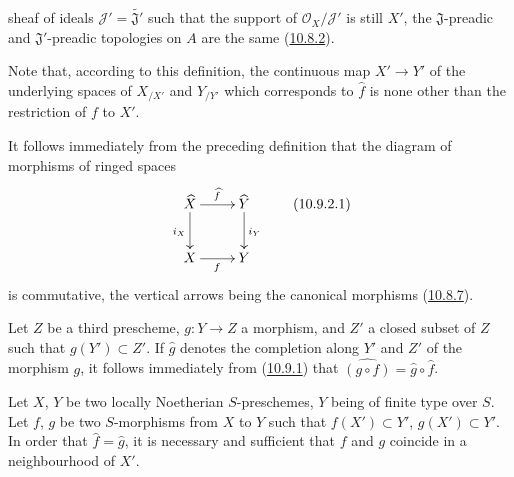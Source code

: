 \begin{env}[10.9.1]

sheaf of ideals
$\mathscr{J}'=\widetilde{\mathfrak{J}'}$ such that the support of
$\mathscr{O}_X/\mathscr{J}'$ is still $X'$, the
$\mathfrak{J}$-preadic and $\mathfrak{J}'$-preadic topologies on $A$
are the same (\hyperref[I.10.8.2]{10.8.2}).

Note that, according to this definition, the continuous map
$X'\to Y'$ of the underlying spaces of $X_{/X'}$ and $Y_{/Y'}$ which
corresponds to $\widehat f$ is none other than the restriction of $f$ to
$X'$.
\end{env}

\begin{env}[10.9.2]
\label{I.10.9.2}
It follows immediately from the preceding definition that the diagram
of morphisms of ringed spaces
\[ \xymatrix{
    \widehat X\ar[r]^{\widehat f}\ar[d]_{i_X} &
    \widehat Y\ar[d]^{i_Y}\\
    X\ar[r]_f &
    Y
  }
\tag{10.9.2.1}\label{I.10.9.2.1}
\]
is commutative, the vertical arrows being the canonical morphisms
(\hyperref[I.10.8.7]{10.8.7}).
\end{env}

\begin{env}[10.9.3]
\label{I.10.9.3}
Let $Z$ be a third prescheme, $g:Y\to Z$ a morphism, and $Z'$ a
closed subset of $Z$ such that $g(Y')\subset Z'$. If $\widehat g$
denotes the completion along $Y'$ and $Z'$ of the morphism $g$, it
follows immediately from (\hyperref[I.10.9.1]{10.9.1}) that
$\widehat{(g\circ f)}=\widehat g\circ\widehat f$.
\end{env}

\begin{proposition}[10.9.4]
\label{I.10.9.4}
Let $X$, $Y$ be two locally Noetherian $S$-preschemes, $Y$ being of
finite type over $S$. Let $f$, $g$ be two $S$-morphisms from $X$ to $Y$
such that $f(X')\subset Y'$, $g(X')\subset Y'$. In order that
$\widehat f=\widehat g$, it is necessary and sufficient that $f$ and $g$
coincide in a neighbourhood of $X'$.
\end{proposition}


